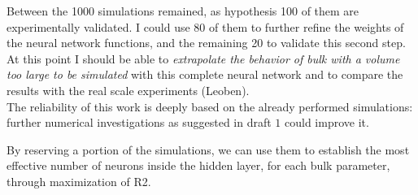 Between the 1000 simulations remained, as hypothesis 100 of them are experimentally validated. I could use 80 of them to further refine the weights of the neural network functions, and the remaining 20 to validate this second step. At this point I should be able to \textit{extrapolate the behavior of bulk with a volume too large to be simulated} with this complete neural network and to compare the results with the real scale experiments (Leoben).\\

The reliability of this work is deeply based on the already performed simulations: further numerical investigations as suggested in draft $1$ could improve it.

By reserving a portion of the simulations, we can use them to establish the most effective number of neurons inside the hidden layer, for each bulk parameter, through maximization of R2.\\